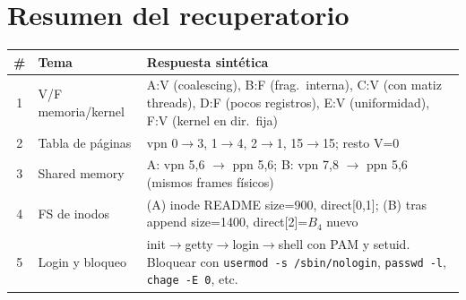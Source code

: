 \documentclass[11pt,a4paper]{article}
\begin{document}
\section*{Resumen del recuperatorio}

\begin{center}
\small
\begin{tabular}{@{}clp{8.8cm}@{}}
\toprule
\# & Tema & Respuesta sintética \\
\midrule
1 & V/F memoria/kernel & A:V (coalescing), B:F (frag.\ interna), C:V (con matiz threads), D:F (pocos registros), E:V (uniformidad), F:V (kernel en dir.\ fija) \\
2 & Tabla de páginas   & vpn 0$\to$3, 1$\to$4, 2$\to$1, 15$\to$15; resto V=0 \\
3 & Shared memory      & A: vpn 5,6 $\to$ ppn 5,6; B: vpn 7,8 $\to$ ppn 5,6 (mismos frames físicos) \\
4 & FS de inodos       & (A) inode README size=900, direct[0,1]; (B) tras append size=1400, direct[2]=$B_4$ nuevo \\
5 & Login y bloqueo    & init$\to$getty$\to$login$\to$shell con PAM y setuid. Bloquear con \texttt{usermod -s /sbin/nologin}, \texttt{passwd -l}, \texttt{chage -E 0}, etc. \\
\bottomrule
\end{tabular}
\end{center}
\end{document}
